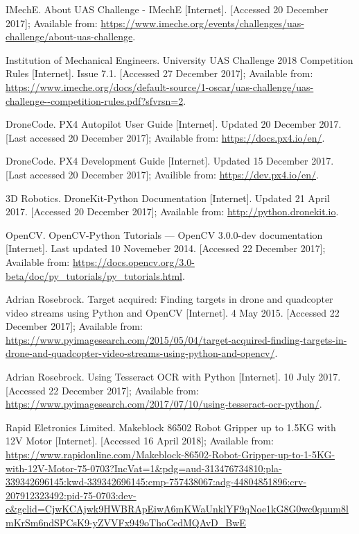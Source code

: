 \documentclass[11pt]{article}
\begin{document}
\newpage
\small
\begin{thebibliography}{11}

    IMechE. About UAS Challenge - IMechE [Internet]. [Accessed 20 December 2017]; Available from: \url{https://www.imeche.org/events/challenges/uas-challenge/about-uas-challenge}.

    Institution of Mechanical Engineers. University UAS Challenge 2018 Competition Rules [Internet]. Issue 7.1. [Accessed 27 December 2017]; Available from: \url{https://www.imeche.org/docs/default-source/1-oscar/uas-challenge/uas-challenge--competition-rules.pdf?sfvrsn=2}.

    DroneCode. PX4 Autopilot User Guide [Internet]. Updated 20 December 2017. [Last accessed 20 December 2017]; Available from: \url{https://docs.px4.io/en/}.

    DroneCode. PX4 Development Guide [Internet]. Updated 15 December 2017. [Last accessed 20 December 2017]; Availible from: \url{https://dev.px4.io/en/}.

    3D Robotics. DroneKit-Python Documentation [Internet]. Updated 21 April 2017. [Accessed 20 December 2017]; Available from: \url{http://python.dronekit.io}.

    OpenCV. OpenCV-Python Tutorials — OpenCV 3.0.0-dev documentation [Internet]. Last updated 10 Novemeber 2014. [Accessed 22 December 2017]; Available from: \url{https://docs.opencv.org/3.0-beta/doc/py_tutorials/py_tutorials.html}.

    Adrian Rosebrock. Target acquired: Finding targets in drone and quadcopter video streams using Python and OpenCV [Internet]. 4 May 2015. [Accessed 22 December 2017]; Available from: \url{https://www.pyimagesearch.com/2015/05/04/target-acquired-finding-targets-in-drone-and-quadcopter-video-streams-using-python-and-opencv/}.

    Adrian Rosebrock. Using Tesseract OCR with Python [Internet]. 10 July 2017. [Accessed 22 December 2017]; Available from: \url{https://www.pyimagesearch.com/2017/07/10/using-tesseract-ocr-python/}.

    Rapid Eletronics Limited. Makeblock 86502 Robot Gripper up to 1.5KG with 12V Motor [Internet]. [Accessed 16 April 2018]; Available from: \url{https://www.rapidonline.com/Makeblock-86502-Robot-Gripper-up-to-1-5KG-with-12V-Motor-75-0703?IncVat=1&pdg=aud-313476734810:pla-339342696145:kwd-339342696145:cmp-757438067:adg-44804851896:crv-207912323492:pid-75-0703:dev-c&gclid=CjwKCAjwk9HWBRApEiwA6mKWaUnklYF9qNoe1kG8G0wc0quum8lmKrSm6ndSPCsK9-yZVVFx949oThoCedMQAvD_BwE}


\end{thebibliography}
\end{document}
